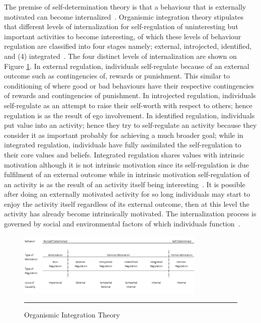 The premise of self-determination theory is that a behaviour that is externally motivated can become internalized~\citep{ryan2000intrinsic}.
Organismic integration theory stipulates that different levels of internalization for self-regulation of uninteresting but important activities to become interesting, of which these levels of behaviour regulation are classified into four stages namely; external, introjected, identified, and (4) integrated~\citep{ryan2000intrinsic}. The four distinct levels of internalization are shown on Figure \ref{figure:oit}. In external regulation, individuals self-regulate because of an external outcome such as contingencies of, rewards or punishment. This similar to conditioning of where good or bad behaviours have their respective contingencies of rewards and contingencies of punishment. In introjected regulation, individuals self-regulate as an attempt to raise their self-worth with respect to others; hence regulation is as the result of ego involvement. In identified regulation, individuals put value into an activity; hence they try to self-regulate an activity because they consider it as important probably for achieving a much broader goal; while in integrated regulation, individuals have fully assimilated the self-regulation to their core values and beliefs. Integrated regulation shares values with intrinsic motivation although it is not intrinsic motivation since its self-regulation is due fulfilment of an external outcome while in intrinsic motivation self-regulation of an activity is as the result of an activity itself being interesting~\citep{ryan2000intrinsic}. It is possible after doing an externally motivated activity for so long individuals may start to enjoy the activity itself regardless of its external outcome, then at this level the activity has already become intrinsically motivated. The internalization process is governed by social and environmental factors of which individuals function~\citep{ryan2000:self,lee2015:relating}.

\begin{figure}[htbp]
  \centering
    \includegraphics[width=0.8\textwidth]{Figures/oit.png}
    \rule{35em}{0.5pt}
  \caption{Organismic Integration Theory~\citep{ryan2000intrinsic}}
  \label{figure:oit}
\end{figure}

